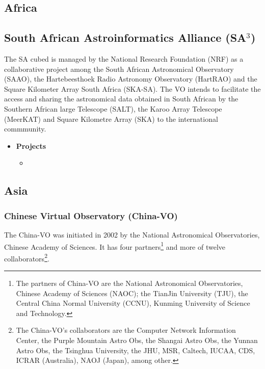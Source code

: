 \begin{comment}
\item \textbf{Description:}
\end{itemize}
\item Variable Star Calculator
\begin{itemize}
\item \textbf{Description:}
\end{itemize}
\item Variable Star Calculator
\begin{itemize}
\item \textbf{Description:}
\end{itemize}
\end{itemize}
\end{itemize}
\end{comment}

\subsection{Africa}
\subsection{South African Astroinformatics Alliance (SA$ ^{3}  $)}
The SA cubed \cite{website:sa3-home} is managed by the National Research
Foundation (NRF) as a collaborative project among the South African Astronomical
Observatory (SAAO), the Hartebeesthoek Radio Astronomy Observatory (HartRAO) and
the Square Kilometer Array South Africa (SKA-SA). The VO intends to facilitate
the access and sharing the astronomical data obtained in South African by the
Southern African large Telescope (SALT), the Karoo Array Telescope (MeerKAT) and
Square Kilometre Array (SKA) to the international commmunity.

\begin{itemize}
\item \textbf{Projects}
\begin{itemize}
\item 
\end{itemize}
\end{itemize}
\subsection{Asia}
\subsubsection{Chinese Virtual Observatory (China-VO)}
The China-VO \cite{website:china-vo-home} was initiated in 2002 by the National
Astronomical Observatories, Chinese Academy of Sciences. It has four
partners\footnote{The partners of China-VO are the National Astronomical
Observatories, Chinese Academy of Sciences (NAOC); the TianJin University (TJU),
the Central China Normal University (CCNU), Kunming University of Science and
Technology.} and more of twelve collaborators\footnote{The China-VO's
collaborators are the Computer Network Information Center, the Purple Mountain
Astro Obs, the Shangai Astro Obs, the Yunnan Astro Obs, the Tsinghua University,
the JHU, MSR, Caltech, IUCAA, CDS, ICRAR (Australia), NAOJ (Japan), among
other.}.

